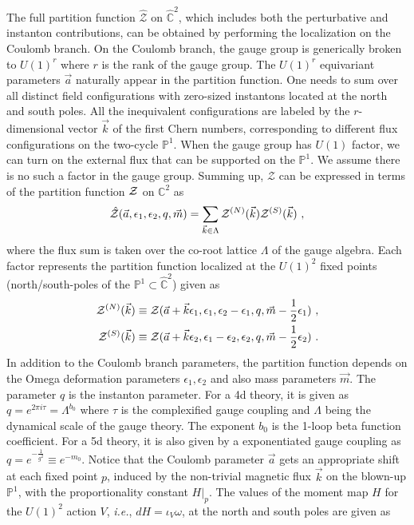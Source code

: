 \documentclass[letterpaper, 11pt]{article}
\def\IC{\mathbb{C}}
\def\IP{\mathbb{P}}
\def\CZ{{\cal Z}}
\def\e{\epsilon}
\def\half{\frac{1}{2}}
\begin{document}
The full partition function $\hat{\mathcal Z}$ on $\hat{\IC}^2$, which includes both the perturbative and instanton contributions, can be obtained by performing the localization on the Coulomb branch. On the Coulomb branch, the gauge group is generically broken to $U(1)^r$ where $r$ is the rank of the gauge group. The $U(1)^r$ equivariant parameters $\vec{a}$ naturally appear in the partition function. One needs to sum over all distinct field configurations with zero-sized instantons located at the north and south poles. All the inequivalent configurations are labeled by the $r$-dimensional vector $\vec{k}$ of the first Chern numbers, corresponding to different flux configurations on the two-cycle $\mathbb{P}^1$. When the gauge group has $U(1)$ factor, we can turn on the external flux that can be supported on the $\IP^1$. We assume there is no such a factor in the gauge group. 
Summing up, $\hat{\mathcal Z}$ can be expressed in terms of the partition function $\CZ$ on $\IC^2$ as \cite{Nekrasov:2003vi, Gottsche:2006bm, Gottsche:2006tn, Gasparim:2008ri, Bonelli:2012ny}
\begin{align} \label{eq:blowup}
  \hat{\mathcal Z}(\vec{a}, \e_1, \e_2, q, \vec{m}) = \sum_{\vec{k} \in \Lambda} \CZ^{(N)}(\vec{k}) \CZ^{(S)}(\vec{k}) \ , 
\end{align}
where the flux sum is taken over the co-root lattice $\Lambda$ of the gauge algebra. Each factor represents the partition function localized at the $U(1)^2$ fixed points (north/south-poles of the $\IP^1 \subset \hat{\IC}^2$) given as 
\begin{align}
\begin{split}
 \CZ^{(N)}(\vec{k}) &\equiv \CZ (\vec{a}+ \vec{k} \e_1, \e_1, \e_2 - \e_1, q, \vec{m}-\half{\e_1}) \ , \\
 \CZ^{(S)}(\vec{k}) & \equiv  \CZ (\vec{a}+\vec{k} \e_2, \e_1 - \e_2, \e_2, q, \vec{m}-\half{\e_2})  \ . 
\end{split}
\end{align}
 In addition to the Coulomb branch parameters, the partition function depends on the Omega deformation parameters $\e_1, \e_2$ and also mass parameters $\vec{m}$. The parameter $q$ is the instanton parameter. For a 4d theory, it is given as $q = e^{2\pi i \tau} = \Lambda^{b_0} $ where $\tau$ is the complexified gauge coupling and $\Lambda$ being the dynamical scale of the gauge theory. The exponent $b_0$ is the 1-loop beta function coefficient. For a 5d theory, it is also given by a exponentiated gauge coupling as $q=e^{-\frac{1}{g^2}} \equiv e^{-m_0}$. 
Notice that the Coulomb parameter $\vec{a}$ gets an appropriate shift at each fixed point $p$, induced by the non-trivial magnetic flux $\vec{k}$ on the blown-up $\IP^1$, with the proportionality constant $H|_p$. The values of the moment map $H$ for the $U(1)^2$ action $V$,  \textit{i.e.}, $dH = \iota_V \omega$, at the north and south poles are given as
\end{document}
